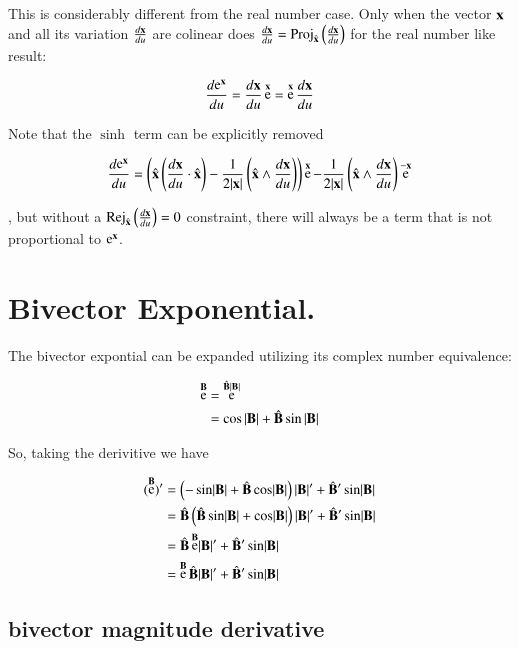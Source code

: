 \documentclass{article}      %
\DeclareMathOperator{\Exp}{e}
\DeclareMathOperator{\Rej}{Rej}
\newcommand{\Bcap}[0]{\hat{\BB}}
\newcommand{\Babs}[0]{\abs{\BB}}
\newcommand{\ddu}[1] {\frac {d{#1}} {du}}
\begin{document}
This is considerably different from the real number case.  Only when the vector $\mathbf{x}$ and all its variation
$\ddu{\Bx}$ are colinear does $\ddu{\Bx} = \Proj_{\xcap}\left(\ddu{\Bx}\right)$ for the real number like result:

\begin{equation}
\ddu{\Exp^{\Bx}} = \ddu{\Bx} \Exp^{\Bx} = \Exp^{\Bx} \ddu{\Bx} 
\end{equation}

Note that the $\sinh$ term can be explicitly removed

\begin{align*}
\ddu{\Exp^{\Bx}} 
=
\left(\xcap \left(\ddu{\Bx} \cdot \xcap\right) - \inv{2\abs\Bx}\left(\xcap \wedge \ddu{\Bx} \right) \right) \Exp^{\Bx}
 - \inv{2\abs\Bx}\left(\xcap \wedge \ddu{\Bx} \right) \Exp^{-\Bx} \\
\end{align*}

, but without a $\Rej_{\xcap}\left(\ddu{\Bx}\right) = 0$
constraint, there will always be a term that is not proportional to $\Exp^{\Bx}$.

\section{ Bivector Exponential. }

The bivector expontial can be expanded utilizing its complex number equivalence:

\begin{align*}
\Exp^{\BB}
&= \Exp^{\Bcap\Babs} \\
&= \cos{\Babs} + \Bcap\sin{\Babs} \\
\end{align*}

So, taking the derivitive we have

\begin{align*}
(\Exp^{\BB})'
&= \left(-\sin\Babs + \Bcap\cos\Babs\right)\Babs' + \Bcap' \sin\Babs \\
&= \Bcap \left(\Bcap\sin\Babs + \cos\Babs\right)\Babs' + \Bcap' \sin\Babs \\
&= \Bcap \Exp^{\BB} \Babs' + \Bcap' \sin\Babs \\
&= \Exp^{\BB} \Bcap \Babs' + \Bcap' \sin\Babs \\
\end{align*}

\subsection{ bivector magnitude derivative }
\end{document}
